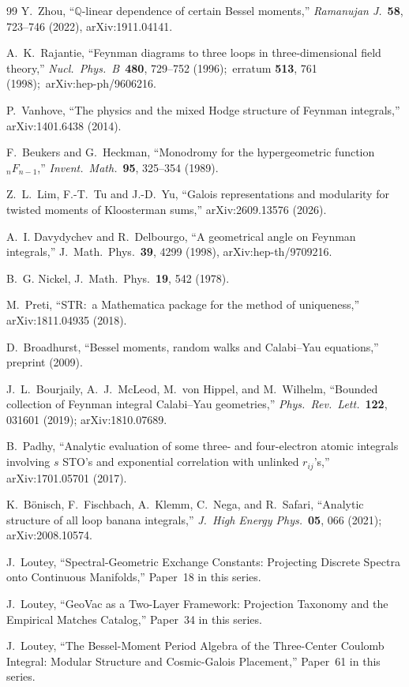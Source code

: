 \documentclass[aps,pra,twocolumn,superscriptaddress,longbibliography]{revtex4-2}
\begin{document}
\begin{thebibliography}{99}
Y.~Zhou, ``$\mathbb{Q}$-linear dependence of certain Bessel moments,''
\textit{Ramanujan J.}\ \textbf{58}, 723--746 (2022), arXiv:1911.04141.

A.~K.~Rajantie, ``Feynman diagrams to three loops in three-dimensional field
theory,'' \textit{Nucl.\ Phys.\ B}\ \textbf{480}, 729--752 (1996);\ erratum
\textbf{513}, 761 (1998);\ arXiv:hep-ph/9606216.

P.~Vanhove, ``The physics and the mixed Hodge structure of Feynman
integrals,'' arXiv:1401.6438 (2014).

F.~Beukers and G.~Heckman, ``Monodromy for the hypergeometric function
${}_nF_{n-1}$,'' \textit{Invent.\ Math.}\ \textbf{95}, 325--354 (1989).

Z.~L.~Lim, F.-T.~Tu and J.-D.~Yu, ``Galois representations and modularity
for twisted moments of Kloosterman sums,'' arXiv:2609.13576 (2026).

A.~I. Davydychev and R.~Delbourgo, ``A geometrical angle on Feynman
integrals,'' J.~Math.~Phys.~\textbf{39}, 4299 (1998), arXiv:hep-th/9709216.

B.~G. Nickel, J.~Math.~Phys.~\textbf{19}, 542 (1978).

M.~Preti, ``STR:\ a Mathematica package for the method of uniqueness,''
arXiv:1811.04935 (2018).

D.~Broadhurst, ``Bessel moments, random walks and Calabi--Yau equations,''
preprint (2009).

J.~L.~Bourjaily, A.~J.~McLeod, M.~von Hippel, and M.~Wilhelm, ``Bounded
collection of Feynman integral Calabi--Yau geometries,'' \textit{Phys.\
Rev.\ Lett.}\ \textbf{122}, 031601 (2019); arXiv:1810.07689.

B.~Padhy, ``Analytic evaluation of some three- and four-electron atomic
integrals involving $s$ STO's and exponential correlation with unlinked
$r_{ij}$'s,'' arXiv:1701.05701 (2017).

K.~B\"onisch, F.~Fischbach, A.~Klemm, C.~Nega, and R.~Safari, ``Analytic
structure of all loop banana integrals,'' \textit{J.\ High Energy Phys.}\
\textbf{05}, 066 (2021); arXiv:2008.10574.

J.~Loutey, ``Spectral-Geometric Exchange Constants: Projecting Discrete
Spectra onto Continuous Manifolds,'' Paper~18 in this series.

J.~Loutey, ``GeoVac as a Two-Layer Framework: Projection Taxonomy and the
Empirical Matches Catalog,'' Paper~34 in this series.

J.~Loutey, ``The Bessel-Moment Period Algebra of the Three-Center Coulomb
Integral: Modular Structure and Cosmic-Galois Placement,'' Paper~61 in this
series.

\end{thebibliography}
\end{document}
